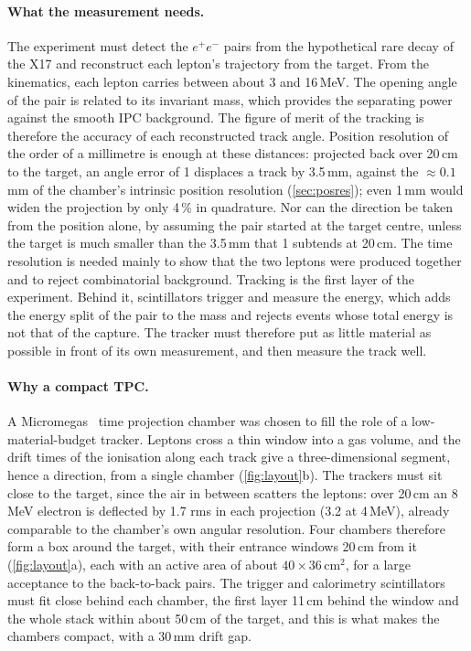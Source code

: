 \paragraph{What the measurement needs.}
The experiment must detect the $e^+e^-$ pairs from the hypothetical rare decay of the X17 and reconstruct each
lepton's trajectory from the target. From the kinematics, each lepton carries between about 3 and 16\,MeV. The
opening angle of the pair is related to its invariant mass, which provides the separating power against the smooth
IPC background. The figure of merit of the tracking is therefore the accuracy of each reconstructed track angle.
Position resolution of the order of a millimetre is enough at these distances: projected back over 20\,cm to the
target, an angle error of 1\textdegree{} displaces a track by 3.5\,mm, against the ${\approx}0.1$\,mm of the chamber's
intrinsic position resolution (\cref{sec:posres}); even 1\,mm would widen the projection by only 4\,\% in quadrature.
Nor can the direction be taken from the position alone, by assuming the pair started at the target centre, unless
the target is much smaller than the 3.5\,mm that 1\textdegree{} subtends at 20\,cm. The time resolution is needed
mainly to show that the two leptons were produced together and to reject combinatorial background. Tracking is the
first layer of the experiment. Behind it, scintillators trigger and measure the energy, which adds the energy split
of the pair to the mass and rejects events whose total energy is not that of the capture. The tracker must therefore
put as little material as possible in front of its own measurement, and then measure the track well.

\paragraph{Why a compact TPC.}
A Micromegas~\cite{Giomataris1996} time projection chamber was chosen to fill the role of a low-material-budget
tracker. Leptons cross a thin window into a gas volume, and the drift times of the ionisation along each track give
a three-dimensional segment, hence a direction, from a single chamber (\cref{fig:layout}b). The trackers must sit
close to the target, since the air in between scatters the leptons: over 20\,cm an 8\,MeV electron is deflected by
1.7\textdegree{} rms in each projection (3.2\textdegree{} at 4\,MeV), already comparable to the chamber's own angular
resolution. Four chambers therefore form a box around the target, with their entrance windows 20\,cm from it
(\cref{fig:layout}a), each with an active area of about $40\times36$\,cm$^2$, for a large acceptance to the
back-to-back pairs. The trigger and calorimetry scintillators must fit close behind each chamber, the first layer
11\,cm behind the window and the whole stack within about 50\,cm of the target, and this is what makes the chambers
compact, with a 30\,mm drift gap.

